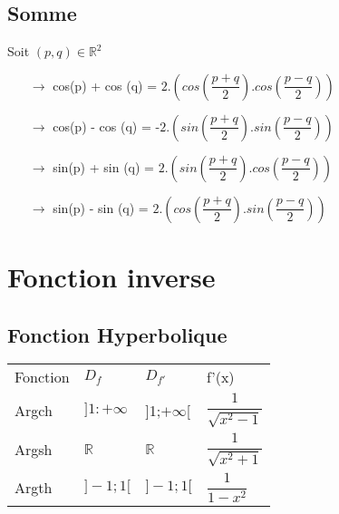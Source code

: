 \subsection{Somme}
Soit $(p,q) \in \mathbb{R}^2$
\begin{itemize}
\item[{$\rightarrow$}]cos(p) + cos (q) = $2.(cos(\dfrac{p+q}{2}).cos(\dfrac{p-q}{2}))$ \\
\item[{$\rightarrow$}]cos(p) - cos (q) = -$2.(sin(\dfrac{p+q}{2}).sin(\dfrac{p-q}{2}))$\\
\item[{$\rightarrow$}]sin(p) + sin (q) = $2.(sin(\dfrac{p+q}{2}).cos(\dfrac{p-q}{2}))$\\
\item[{$\rightarrow$}]sin(p) - sin (q) = $2.(cos(\dfrac{p+q}{2}).sin(\dfrac{p-q}{2}))$
\end{itemize}
\section{Fonction inverse}
\subsection{Fonction Hyperbolique}
\begin{center}
\begin{tabular}{llll}
Fonction & $D_f$ & $D_{f'}$ & f'(x) \\
Argch & $]1:+\infty$ & ]1;$+\infty$[ & $\dfrac{1}{\sqrt{x^2-1}}$ \\  
Argsh & $\mathbb{R}$ & $\mathbb{R}$ & $\dfrac{1}{\sqrt{x^2+1}}$ \\ 
Argth & $]-1;1[$ & $]-1;1[$ & $\dfrac{1}{1-x^2}$ \\ 
\end{tabular}
\end{center}
